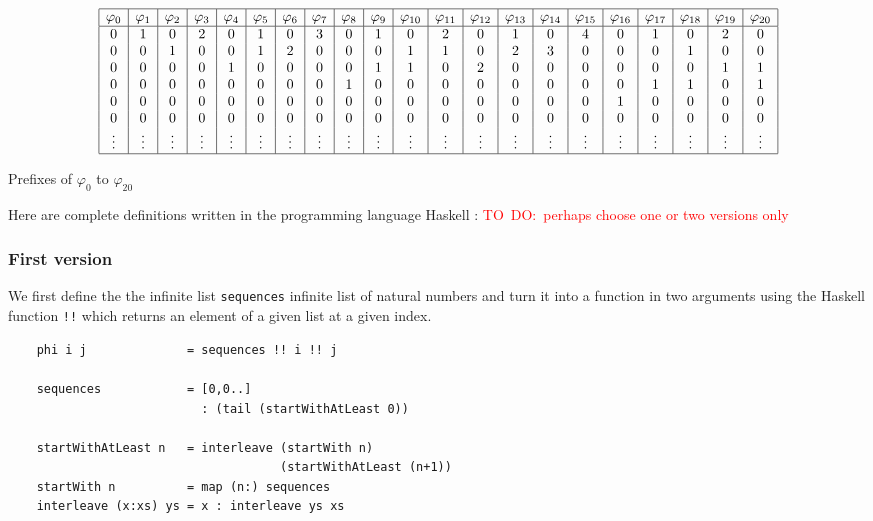 \documentclass[envcountsame]{llncs}
\newcommand{\todo}[1]{\textcolor{red}{TO~DO:~#1}}
\begin{document}
\noindent
\begin{table}\label{tab:phi}
\[\begin{array}{|c|c|c|c|c|c|c|c|c|c|c|c|c|c|c|c|c|c|c|c|c|}
\hline
\varphi_{0} & \varphi_{1} & \varphi_{2} & \varphi_{3} & \varphi_{4} & \varphi_{5} & \varphi_{6} & \varphi_{7} & \varphi_{8} & \varphi_{9} & \varphi_{10} & \varphi_{11} & \varphi_{12} & \varphi_{13} & \varphi_{14} & \varphi_{15} & \varphi_{16} & \varphi_{17} & \varphi_{18} & \varphi_{19} & \varphi_{20}\\
\hline
0 & 1 & 0 & 2 & 0 & 1 & 0 & 3 & 0 & 1 & 0 & 2 & 0 & 1 & 0 & 4 & 0 & 1 & 0 & 2 & 0\\
0 & 0 & 1 & 0 & 0 & 1 & 2 & 0 & 0 & 0 & 1 & 1 & 0 & 2 & 3 & 0 & 0 & 0 & 1 & 0 & 0\\
0 & 0 & 0 & 0 & 1 & 0 & 0 & 0 & 0 & 1 & 1 & 0 & 2 & 0 & 0 & 0 & 0 & 0 & 0 & 1 & 1\\
0 & 0 & 0 & 0 & 0 & 0 & 0 & 0 & 1 & 0 & 0 & 0 & 0 & 0 & 0 & 0 & 0 & 1 & 1 & 0 & 1\\
0 & 0 & 0 & 0 & 0 & 0 & 0 & 0 & 0 & 0 & 0 & 0 & 0 & 0 & 0 & 0 & 1 & 0 & 0 & 0 & 0\\
0 & 0 & 0 & 0 & 0 & 0 & 0 & 0 & 0 & 0 & 0 & 0 & 0 & 0 & 0 & 0 & 0 & 0 & 0 & 0 & 0\\
\vdots & \vdots & \vdots & \vdots & \vdots & \vdots & \vdots & \vdots & \vdots & \vdots & \vdots & \vdots & \vdots & \vdots & \vdots & \vdots & \vdots & \vdots & \vdots & \vdots & \vdots\\
\hline
\end{array}\]
\caption{Prefixes of $\varphi_0$ to $\varphi_{20}$}
\end{table}

Here are complete definitions written in the programming language Haskell : \todo{perhaps choose one or two  versions only}



\subsubsection{First version}
We first define the the infinite list \texttt{sequences} infinite list of natural numbers and turn it into a function in two arguments using the Haskell function \verb+!!+ which returns an element of a given list at a given index.
\begin{verbatim}
    phi i j              = sequences !! i !! j
    
    sequences            = [0,0..]
                           : (tail (startWithAtLeast 0))
    
    startWithAtLeast n   = interleave (startWith n) 
                                      (startWithAtLeast (n+1))
    startWith n          = map (n:) sequences
    interleave (x:xs) ys = x : interleave ys xs
\end{verbatim}
\end{document}
